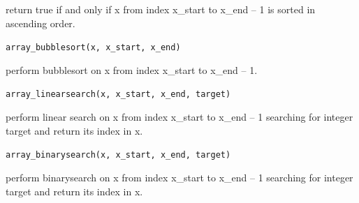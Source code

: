 return true if and only if x from index x\_start to x\_end -- 1 is
sorted in ascending order.

\texttt{array\_bubblesort(x, x\_start, x\_end)}

perform bubblesort on x from index x\_start to x\_end -- 1.

\texttt{array\_linearsearch(x, x\_start, x\_end, target)}

perform linear search on x from index x\_start to x\_end -- 1 searching
for integer target and return its index in x.

\texttt{array\_binarysearch(x, x\_start, x\_end, target)}

perform binarysearch on x from index x\_start to x\_end -- 1 searching
for integer target and return its index in x.

